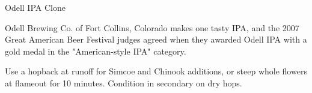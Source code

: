 \begin{recipie}{Odell IPA Clone}

\begin{aboutblock}
Odell Brewing Co. of Fort Collins, Colorado makes one tasty IPA, and the 2007
Great American Beer Festival judges agreed when they awarded Odell IPA with a
gold medal in the "American-style IPA" category. 
\end{aboutblock}


\begin{methodandtiming}
 
\begin{mashsteps}
\end{mashsteps}

\begin{fermentationsteps}
\end{fermentationsteps}

\begin{directions}
Use a hopback at runoff for  Simcoe and Chinook additions, or steep
whole flowers at flameout for 10 minutes. Condition in secondary on dry hops.
\end{directions}

\end{methodandtiming}

\pagebreak

\begin{ingredientsblock}

\begin{malts}
\end{malts}

\begin{hops}
\end{hops}


\end{ingredientsblock}

\end{recipie}

